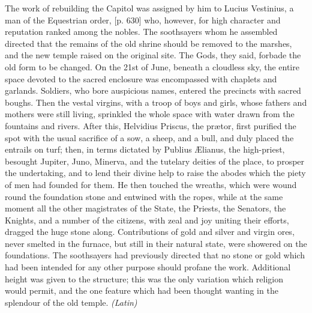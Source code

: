 The work of rebuilding the Capitol was assigned by him to Lucius Vestinius, a man of the Equestrian order, [p. 630] who, however, for high character and reputation ranked among the nobles. The soothsayers whom he assembled directed that the remains of the old shrine should be removed to the marshes, and the new temple raised on the original site. The Gods, they said, forbade the old form to be changed. On the 21st of June, beneath a cloudless sky, the entire space devoted to the sacred enclosure was encompassed with chaplets and garlands. Soldiers, who bore auspicious names, entered the precincts with sacred boughs. Then the vestal virgins, with a troop of boys and girls, whose fathers and mothers were still living, sprinkled the whole space with water drawn from the fountains and rivers. After this, Helvidius Priscus, the prætor, first purified the spot with the usual sacrifice of a sow, a sheep, and a bull, and duly placed the entrails on turf; then, in terms dictated by Publius Ælianus, the high-priest, besought Jupiter, Juno, Minerva, and the tutelary deities of the place, to prosper the undertaking, and to lend their divine help to raise the abodes which the piety of men had founded for them. He then touched the wreaths, which were wound round the foundation stone and entwined with the ropes, while at the same moment all the other magistrates of the State, the Priests, the Senators, the Knights, and a number of the citizens, with zeal and joy uniting their efforts, dragged the huge stone along. Contributions of gold and silver and virgin ores, never smelted in the furnace, but still in their natural state, were showered on the foundations. The soothsayers had previously directed that no stone or gold which had been intended for any other purpose should profane the work. Additional height was given to the structure; this was the only variation which religion would permit, and the one feature which had been thought wanting in the splendour of the old temple. \emph{(Latin)}


